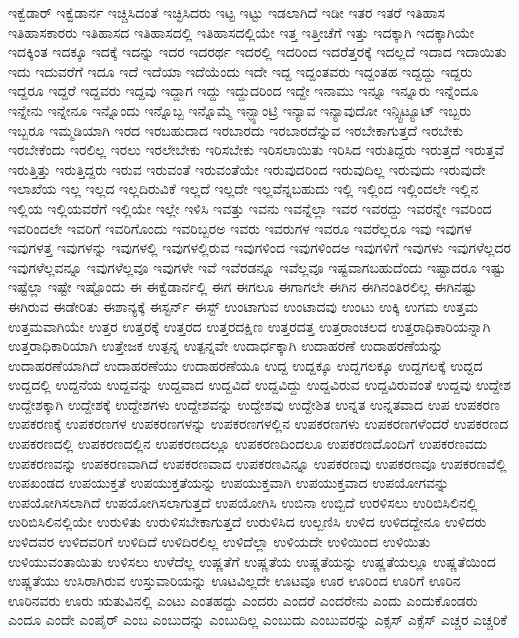 {ಇಕ್ವೆಡಾರ್
ಇಕ್ವೆಡಾರ್ನ
ಇಚ್ಚಿಸಿದಂತೆ
ಇಚ್ಛಿಸಿದರು
ಇಟ್ಟ
ಇಟ್ಟು
ಇಡಲಾಗಿದೆ
ಇಡೀ
ಇತರ
ಇತರೆ
ಇತಿಹಾಸ
ಇತಿಹಾಸಕಾರರು
ಇತಿಹಾಸದ
ಇತಿಹಾಸದಲ್ಲಿ
ಇತಿಹಾಸದಲ್ಲಿಯೇ
ಇತ್ತ
ಇತ್ತೀಚೆಗೆ
ಇತ್ತು
ಇದಕ್ಕಾಗಿ
ಇದಕ್ಕಾಗಿಯೇ
ಇದಕ್ಕಿಂತ
ಇದಕ್ಕೂ
ಇದಕ್ಕೆ
ಇದನ್ನು
ಇದರ
ಇದರರ್ಥ
ಇದರಲ್ಲಿ
ಇದರಿಂದ
ಇದರೆತ್ತರಕ್ಕೆ
ಇದಲ್ಲದೆ
ಇದಾದ
ಇದಾಯಿತು
ಇದು
ಇದುವರೆಗೆ
ಇದೂ
ಇದೆ
ಇದೆಯಾ
ಇದೆಯೆಂದು
ಇದೇ
ಇದ್ದ
ಇದ್ದಂತವರು
ಇದ್ದಂತಹ
ಇದ್ದದ್ದು
ಇದ್ದರು
ಇದ್ದರೂ
ಇದ್ದರೆ
ಇದ್ದವರು
ಇದ್ದವು
ಇದ್ದಾಗ
ಇದ್ದು
ಇದ್ದುದರಿಂದ
ಇದ್ದೇ
ಇನಾಮು
ಇನ್ನೂ
ಇನ್ನೂರು
ಇನ್ನೆಂದೂ
ಇನ್ನೇನು
ಇನ್ನೇನೂ
ಇನ್ನೊಂದು
ಇನ್ನೊಬ್ಬ
ಇನ್ನೊಮ್ಮೆ
ಇನ್ಫ್ಯಾಂಟ್ರಿ
ಇನ್ಯಾವ
ಇನ್ಯಾವುದೋ
ಇನ್ಸ್ಟಿಟ್ಯೂಟ್
ಇಬ್ಬರು
ಇಬ್ಬರೂ
ಇಮ್ಮಡಿಯಾಗಿ
ಇರದ
ಇರಬಹುದಾದ
ಇರಬಾರದು
ಇರಬಾರದೆನ್ನುವ
ಇರಬೇಕಾಗುತ್ತದೆ
ಇರಬೇಕು
ಇರಬೇಕೆಂದು
ಇರಲಿಲ್ಲ
ಇರಲು
ಇರಲೇಬೇಕು
ಇರಿಸಬೇಕು
ಇರಿಸಲಾಯಿತು
ಇರಿಸಿದ
ಇರುತಿದ್ದರು
ಇರುತ್ತದೆ
ಇರುತ್ತವೆ
ಇರುತ್ತಿತ್ತು
ಇರುತ್ತಿದ್ದರು
ಇರುವ
ಇರುವಂತೆ
ಇರುವಂತೆಯೇ
ಇರುವುದರಿಂದ
ಇರುವುದಿಲ್ಲ
ಇರುವುದು
ಇರುವುದೇ
ಇಲಾಖೆಯ
ಇಲ್ಲ
ಇಲ್ಲದ
ಇಲ್ಲದಿರುವಿಕೆ
ಇಲ್ಲದೆ
ಇಲ್ಲದೇ
ಇಲ್ಲವೆನ್ನಬಹುದು
ಇಲ್ಲಿ
ಇಲ್ಲಿಂದ
ಇಲ್ಲಿಂದಲೇ
ಇಲ್ಲಿನ
ಇಲ್ಲಿಯ
ಇಲ್ಲಿಯವರೆಗೆ
ಇಲ್ಲಿಯೇ
ಇಲ್ಲೇ
ಇಳಿಸಿ
ಇವತ್ತು
ಇವನು
ಇವನ್ನೆಲ್ಲಾ
ಇವರ
ಇವರದ್ದು
ಇವರನ್ನೇ
ಇವರಿಂದ
ಇವರಿಂದಲೇ
ಇವರಿಗೆ
ಇವರಿಗೊಂದು
ಇವರಿಬ್ಬರಅ
ಇವರು
ಇವರುಗಳ
ಇವರೂ
ಇವರೆಲ್ಲರೂ
ಇವು
ಇವುಗಳ
ಇವುಗಳತ್ತ
ಇವುಗಳನ್ನು
ಇವುಗಳಲ್ಲಿ
ಇವುಗಳಲ್ಲಿರುವ
ಇವುಗಳಿಂದ
ಇವುಗಳಿಂದಅ
ಇವುಗಳಿಗೆ
ಇವುಗಳು
ಇವುಗಳೆಲ್ಲದರ
ಇವುಗಳೆಲ್ಲವನ್ನೂ
ಇವುಗಳೆಲ್ಲವೂ
ಇವುಗಳೇ
ಇವೆ
ಇವೆರಡನ್ನೂ
ಇವೆಲ್ಲವೂ
ಇಷ್ಟವಾಗಬಹುದೆಂದು
ಇಷ್ಟಾದರೂ
ಇಷ್ಟು
ಇಷ್ಟೆಲ್ಲಾ
ಇಷ್ಟೇ
ಇಷ್ಟೊಂದು
ಈ
ಈಕ್ವೆಡಾರ್ನಲ್ಲಿ
ಈಗ
ಈಗಲೂ
ಈಗಾಗಲೇ
ಈಗಿನ
ಈಗಿನಂತಿರಲಿಲ್ಲ
ಈಗಿನಷ್ಟು
ಈಗಿರುವ
ಈಡೇರಿತು
ಈಶಾನ್ಯಕ್ಕೆ
ಈಸ್ಟರ್ನ್
ಈಸ್ಟ್
ಉಂಟಾಗುವ
ಉಂಟಾದವು
ಉಂಟು
ಉಕ್ಕಿ
ಉಗಮ
ಉತ್ತಮ
ಉತ್ತಮವಾಗಿಯೇ
ಉತ್ತರ
ಉತ್ತರಕ್ಕೆ
ಉತ್ತರದ
ಉತ್ತರದಕ್ಷಿಣ
ಉತ್ತರದತ್ತ
ಉತ್ತರಾಂಚಲದ
ಉತ್ತರಾಧಿಕಾರಿಯನ್ನಾಗಿ
ಉತ್ತರಾಧಿಕಾರಿಯಾಗಿ
ಉತ್ತೇಜಕ
ಉತ್ಪನ್ನ
ಉತ್ಪನ್ನವೇ
ಉದಾರ್ಧಕ್ಕಾಗಿ
ಉದಾಹರಣೆ
ಉದಾಹರಣೆಯನ್ನು
ಉದಾಹರಣೆಯಾಗಿದೆ
ಉದಾಹರಣೆಯು
ಉದಾಹರಣೆಯೂ
ಉದ್ದ
ಉದ್ದಕ್ಕೂ
ಉದ್ದಗಲಕ್ಕೂ
ಉದ್ದಗಲಕ್ಕೆ
ಉದ್ದದ
ಉದ್ದದಲ್ಲಿ
ಉದ್ದನೆಯ
ಉದ್ದವನ್ನು
ಉದ್ದವಾದ
ಉದ್ದವಿದೆ
ಉದ್ದವಿದ್ದು
ಉದ್ದವಿರುವ
ಉದ್ದವಿರುವಂತೆ
ಉದ್ದವು
ಉದ್ದೇಶ
ಉದ್ದೇಶಕ್ಕಾಗಿ
ಉದ್ದೇಶಕ್ಕೆ
ಉದ್ದೇಶಗಳು
ಉದ್ದೇಶವನ್ನು
ಉದ್ದೇಶವು
ಉದ್ದೇಶಿತ
ಉನ್ನತ
ಉನ್ನತವಾದ
ಉಪ
ಉಪಕರಣ
ಉಪಕರಣಕ್ಕೆ
ಉಪಕರಣಗಳ
ಉಪಕರಣಗಳನ್ನು
ಉಪಕರಣಗಳಲ್ಲಿನ
ಉಪಕರಣಗಳು
ಉಪಕರಣಗಳೆಂದರೆ
ಉಪಕರಣದ
ಉಪಕರಣದಲ್ಲಿ
ಉಪಕರಣದಲ್ಲಿನ
ಉಪಕರಣದಲ್ಲೂ
ಉಪಕರಣದಿಂದಲೂ
ಉಪಕರಣದೊಂದಿಗೆ
ಉಪಕರಣವದು
ಉಪಕರಣವನ್ನು
ಉಪಕರಣವಾಗಿದೆ
ಉಪಕರಣವಾದ
ಉಪಕರಣವಿನ್ನೂ
ಉಪಕರಣವು
ಉಪಕರಣವೂ
ಉಪಕರಣವೆಲ್ಲಿ
ಉಪಖಂಡದ
ಉಪಯುಕ್ತತೆ
ಉಪಯುಕ್ತತೆಯನ್ನು
ಉಪಯುಕ್ತವಾಗಿ
ಉಪಯುಕ್ತವಾದ
ಉಪಯೋಗವನ್ನು
ಉಪಯೋಗಿಸಲಾಗಿದೆ
ಉಪಯೋಗಿಸಲಾಗುತ್ತದೆ
ಉಪಯೋಗಿಸಿ
ಉಬಿನಾ
ಉಬ್ಬಿದೆ
ಉರಳಿಸಲು
ಉರಿಬಿಸಿಲಿನಲ್ಲಿ
ಉರಿಬಿಸಿಲಿನಲ್ಲಿಯೇ
ಉರುಳಿತು
ಉರುಳಿಸಬೇಕಾಗುತ್ತದೆ
ಉರುಳಿಸಿದ
ಉಲ್ಬಣಿಸಿ
ಉಳಿದ
ಉಳಿದದ್ದೇನೂ
ಉಳಿದರು
ಉಳಿದವರ
ಉಳಿದವರಿಗೆ
ಉಳಿದಿದೆ
ಉಳಿದಿರಲಿಲ್ಲ
ಉಳಿದೆಲ್ಲಾ
ಉಳಿಯದೇ
ಉಳಿಯಿಂದ
ಉಳಿಯಿತು
ಉಳಿಯುವಂತಾಯಿತು
ಉಳಿಸಲು
ಉಳೆದೆಲ್ಲ
ಉಷ್ಣತೆಗೆ
ಉಷ್ಣತೆಯ
ಉಷ್ಣತೆಯನ್ನು
ಉಷ್ಣತೆಯಲ್ಲೂ
ಉಷ್ಣತೆಯಿಂದ
ಉಷ್ಣತೆಯು
ಉಸಿರಾಗಿರುವ
ಉಸ್ತುವಾರಿಯನ್ನು
ಊಟವಿಲ್ಲದೇ
ಊಟವೂ
ಊರ
ಊರಿಂದ
ಊರಿಗೆ
ಊರಿನ
ಊರಿನವರು
ಊರು
ಋತುವಿನಲ್ಲಿ
ಎಂಟು
ಎಂತಹದ್ದು
ಎಂದರು
ಎಂದರೆ
ಎಂದರೇನು
ಎಂದು
ಎಂದುಕೊಂಡರು
ಎಂದೂ
ಎಂದೇ
ಎಂಪೈರ್
ಎಂಬ
ಎಂಬುದನ್ನು
ಎಂಬುದಿಲ್ಲ
ಎಂಬುದು
ಎಂಬುವರನ್ನು
ಎಕ್ಸಸ್
ಎಕ್ಸೆಸ್
ಎಚ್ಚರ
ಎಚ್ಚರಿಕೆ
}
